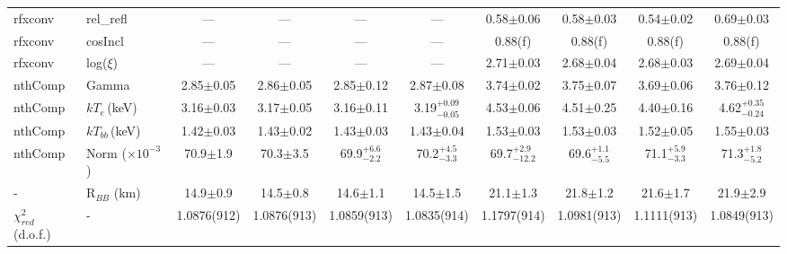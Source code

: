 \documentclass{aa}
\begin{document}
\begin{appendix}
\begin{sidewaystable*}
\begin{tabular}{llcccccccc}
\hline

rfxconv & 
rel\_refl    & 
--- &
--- &
--- &
--- &
0.58$\pm$0.06 &
0.58$\pm$0.03 &
0.54$\pm$0.02 &
0.69$\pm$0.03 \\



rfxconv & 
cosIncl  & 
---&
--- &
--- &
--- &
0.88(f) &
0.88(f) &
0.88(f) &
0.88(f) \\


rfxconv & 
log($\xi$)   & 
--- &
--- &
--- &
--- &
2.71$\pm$0.03 &
2.68$\pm$0.04 &
2.68$\pm$0.03 &
2.69$\pm$0.04\\

\hline

nthComp &
Gamma   & 
2.85$\pm$0.05 &
2.86$\pm$0.05 &
2.85$\pm$0.12 &
2.87$\pm$0.08 &
3.74$\pm$0.02 &
3.75$\pm$0.07 &
3.69$\pm$0.06 &
3.76$\pm$0.12\\



nthComp & 
$kT_{e}\,$(keV) & 
3.16$\pm$0.03 &
3.17$\pm$0.05 &
3.16$\pm$0.11 &
3.19$^{+0.09}_{-0.05}$ &
4.53$\pm$0.06 &
4.51$\pm$0.25 &
4.40$\pm$0.16 &
4.62$^{+0.35}_{-0.24}$ \\


  
  
nthComp & 
$kT_{bb}\,$(keV) & 
1.42$\pm$0.03 &
1.43$\pm$0.02 &
1.43$\pm$0.03 &
1.43$\pm$0.04 &
1.53$\pm$0.03 &
1.53$\pm$0.03 &
1.52$\pm$0.05 & 
1.55$\pm$0.03\\  
 
  

  

nthComp & 
Norm ($\times10^{-3}$)   & 
70.9$\pm$1.9 &
70.3$\pm$3.5&
69.9$^{+6.6}_{-2.2}$ &
70.2$^{+4.5}_{-3.3}$ &
69.7$^{+2.9}_{-12.2}$ &
69.6$^{+1.1}_{-5.5}$ &
71.1$^{+5.9}_{-3.3}$ &
71.3$^{+1.8}_{-5.2}$ \\


\hline


- &
R$_{BB}$ (km)  &  
14.9$\pm$0.9 &
14.5$\pm$0.8&
14.6$\pm$1.1&
14.5$\pm$1.5&
21.1$\pm$1.3&
21.8$\pm$1.2 &
21.6$\pm$1.7 &
21.9$\pm$2.9 \\





 


\hline

 $\chi^{2}_{red}\,$(d.o.f.)   &
 - &
1.0876(912) &
1.0876(913) &
1.0859(913) & 
1.0835(914) & 
1.1797(914) &
1.0981(913) &
1.1111(913) &
1.0849(913) \\
 

\end{tabular}
\end{sidewaystable*}
\end{appendix}
\end{document}
